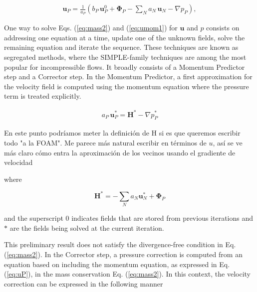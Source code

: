 \documentclass[final,3p,times,10pt,onecolumn]{myElsarticle}
\numberwithin{equation}{section}
\newcommand{\CIP}[1]{{\color{blue} #1}}
\begin{document}
\begin{equation}
\begin{split}
\boldsymbol{u}_P = \frac{1}{a_P}\left(b_P\, \boldsymbol{u}^0_P + \boldsymbol{\Phi}_P - \sum_{N} a_{N}\, \boldsymbol{u}_{N} - \nabla p_P\right),
\label{eq:uP}
\end{split}
\end{equation}

One way to solve Eqs. (\ref{eq:mass2}) and (\ref{eq:umom1}) for $\boldsymbol{u}$ and $p$ consists on addressing one equation at a time, update one of the unknown fields, solve the remaining equation and iterate the sequence. These techniques are known as segregated methods, where the SIMPLE-family techniques \cite{patankar1972,patankar1980,patankar1981,vanDoormal,issa} are among the most popular for incompressible flows. It broadly consists of a Momentum Predictor step and a Corrector step. In the Momentum Predictor, a first approximation for the velocity field is computed using the momentum equation where the pressure term is treated explicitly. 
{\color{red}
\begin{equation} \label{eq:MOMPRED}
\begin{split}
a_P\, \boldsymbol{u}_P^{*} = \boldsymbol{H}^* - \nabla p_P^{*}%
\end{split}
\end{equation}

\CIP{En este punto podríamos meter la definición de H si es que queremos escribir todo "a la FOAM". Me parece más natural escribir en términos de $u$, así se ve más claro cómo entra la aproximación de los vecinos usando el gradiente de velocidad}

\noindent where 

\begin{equation}
\boldsymbol{H}^* = - \sum_N a_N \boldsymbol{u}_N^* + \boldsymbol{\Phi}_P    
\end{equation}

\noindent and the superscript $0$ indicates fields that are stored from previous iterations and $*$ are the fields being solved at the current iteration. }
This preliminary result does not satisfy the divergence-free condition in Eq. (\ref{eq:mass2}). In the Corrector step, a pressure correction is computed from an equation based on including the momentum equation, as expressed in Eq. (\ref{eq:uP}), in the mass conservation  Eq. (\ref{eq:mass2}). In this context, the velocity correction can be expressed in the following manner
\end{document}
